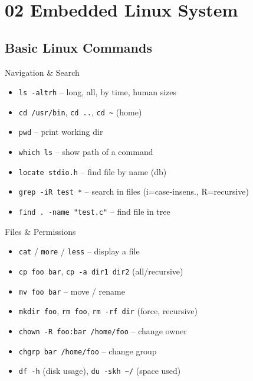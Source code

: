\section{02 Embedded Linux System}

\subsection{Basic Linux Commands}


\begin{definition}{Navigation \& Search}
    \begin{itemize}
        \item \texttt{ls -altrh} -- long, all, by time, human sizes
        \item \texttt{cd /usr/bin}, \texttt{cd ..}, \texttt{cd \textasciitilde} (home)
        \item \texttt{pwd} -- print working dir
        \item \texttt{which ls} -- show path of a command
        \item \texttt{locate stdio.h} -- find file by name (db)
        \item \texttt{grep -iR test *} -- search in files (i=case-insens., R=recursive)
        \item \texttt{find . -name "test.c"} -- find file in tree
    \end{itemize}
\end{definition}

\begin{definition}{Files \& Permissions}
    \begin{itemize}
        \item \texttt{cat} / \texttt{more} / \texttt{less} -- display a file
        \item \texttt{cp foo bar}, \texttt{cp -a dir1 dir2} (all/recursive)
        \item \texttt{mv foo bar} -- move / rename
        \item \texttt{mkdir foo}, \texttt{rm foo}, \texttt{rm -rf dir} (force, recursive)
        \item \texttt{chown -R foo:bar /home/foo} -- change owner
        \item \texttt{chgrp bar /home/foo} -- change group
        \item \texttt{df -h} (disk usage), \texttt{du -skh \textasciitilde/} (space used)
    \end{itemize}
\end{definition}

